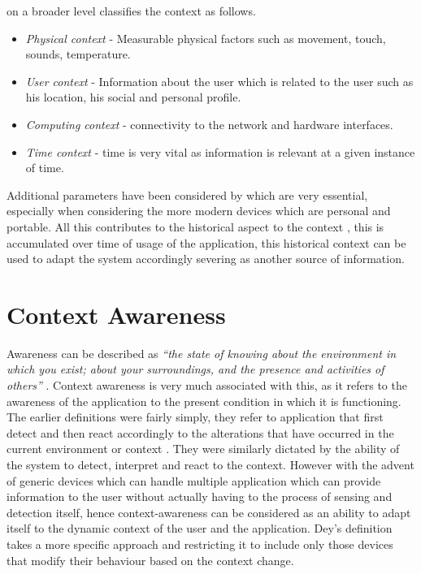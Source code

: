 \documentclass[12pt]{report}
\begin{document}
\cite{schilit1994context} on a broader level classifies the context as follows.
\begin{itemize}
	\item \textit{Physical context} - Measurable physical factors such as movement, touch, sounds, temperature.
	\item \textit{User context} - Information about the user which is related to the user such as his location, his social and personal profile.
	\item \textit{Computing context} - connectivity to the network and hardware interfaces.
	\item \textit{Time context} - time is very vital as information is relevant at a given instance of time.
\end{itemize}

Additional parameters have been considered by \cite{chen2000survey} which are very essential, especially when considering the more modern devices which are personal and portable. All this contributes to the historical aspect to the context \cite{chen2000survey}, this is accumulated over time of usage of the application, this historical context can be used to adapt the system accordingly severing as another source of information.

\section{Context Awareness}
Awareness can be described as \textit{``the state of knowing about the environment in which you exist; about your surroundings, and the presence and activities of others''} \cite{wisneski1998ambient}. Context awareness is very much associated with this, as it refers to the awareness of the application to the present condition in which it is functioning. The earlier definitions were fairly simply, they refer to application that first detect and then react accordingly to the alterations that have occurred in the current environment or context \cite{schilit1994disseminating}. They were similarly dictated by the ability of the system to detect, interpret and react to the context. However with the advent of generic devices which can handle multiple application which can provide information to the user without actually having to the process of sensing and detection itself, hence context-awareness can be considered as an ability to adapt itself to the dynamic context of the user and the application. Dey's \cite{abowd1999towards} definition takes a more specific approach and restricting it to include only those devices that modify their behaviour based on the context change.
\end{document}
